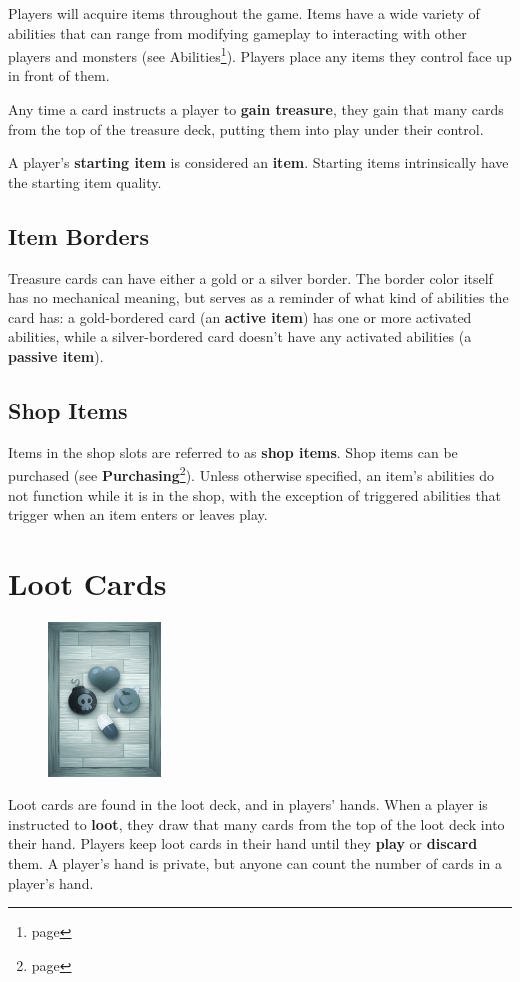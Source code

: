 \documentclass[a4paper, twoside]{report} %
\begin{document}
    Players will acquire items throughout the game. Items have a wide variety of abilities that can range from modifying gameplay to interacting with other players and monsters (see Abilities\footnote{page \pageref{abilities}}). Players place any items they control face up in front of them.
  
    Any time a card instructs a player to \textbf{gain treasure}, they gain that many cards from the top of the treasure deck, putting them into play under their control.
  
    A player’s \textbf{starting item} is considered an \textbf{item}. Starting items intrinsically have the starting item quality.

    \subsection{Item Borders}
    Treasure cards can have either a gold or a silver border. The border color itself has no mechanical meaning, but serves as a reminder of what kind of abilities the card has: a gold-bordered card (an \textbf{active item}) has one or more activated abilities, while a silver-bordered card doesn’t have any activated abilities (a \textbf{passive item}).

    \subsection{Shop Items}
    Items in the shop slots are referred to as \textbf{shop items}. Shop items can be purchased (see \textbf{Purchasing}\footnote{page \pageref{purchasing}}). Unless otherwise specified, an item’s abilities do not function while it is in the shop, with the exception of triggered abilities that trigger when an item enters or leaves play.

    \section{Loot Cards}
    \begin{figure}
        \centering
        \includegraphics[width=30mm]{assets/loot.png}
    \end{figure}
    Loot cards are found in the loot deck, and in players’ hands. When a player is instructed to \textbf{loot}, they draw that many cards from the top of the loot deck into their hand. Players keep loot cards in their hand until they \textbf{play} or \textbf{discard} them. A player’s hand is private, but anyone can count the number of cards in a player’s hand.
\end{document}
